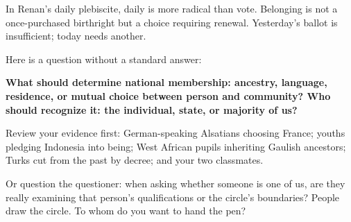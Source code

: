 In Renan's daily plebiscite, daily is more radical than vote. Belonging is not a once-purchased birthright but a choice requiring renewal. Yesterday's ballot is insufficient; today needs another.

Here is a question without a standard answer:

\textbf{What should determine national membership: ancestry, language, residence, or mutual choice between person and community? Who should recognize it: the individual, state, or majority of us?}

Review your evidence first: German-speaking Alsatians choosing France; youths pledging Indonesia into being; West African pupils inheriting Gaulish ancestors; Turks cut from the past by decree; and your two classmates.

Or question the questioner: when asking whether someone is one of us, are they really examining that person's qualifications or the circle's boundaries? People draw the circle. To whom do you want to hand the pen?
